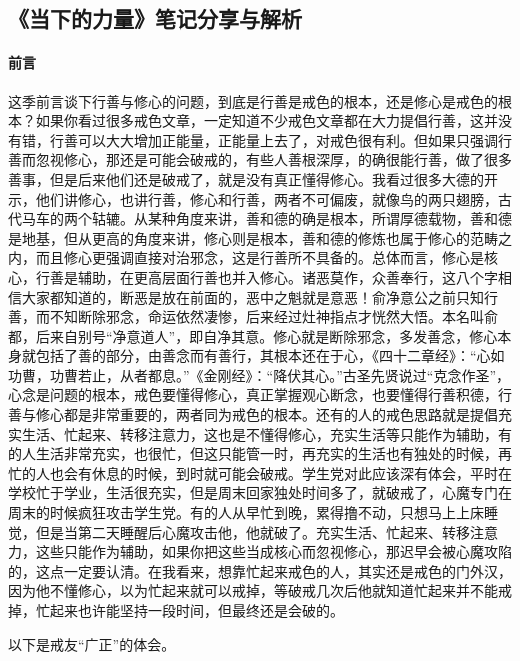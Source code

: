 \subsection{《当下的力量》笔记分享与解析}

\paragraph{前言}

这季前言谈下行善与修心的问题，到底是行善是戒色的根本，还是修心是戒色的根本？如果你看过很多戒色文章，一定知道不少戒色文章都在大力提倡行善，这并没有错，行善可以大大增加正能量，正能量上去了，对戒色很有利。但如果只强调行善而忽视修心，那还是可能会破戒的，有些人善根深厚，的确很能行善，做了很多善事，但是后来他们还是破戒了，就是没有真正懂得修心。我看过很多大德的开示，他们讲修心，也讲行善，修心和行善，两者不可偏废，就像鸟的两只翅膀，古代马车的两个轱辘。从某种角度来讲，善和德的确是根本，所谓厚德载物，善和德是地基，但从更高的角度来讲，修心则是根本，善和德的修炼也属于修心的范畴之内，而且修心更强调直接对治邪念，这是行善所不具备的。总体而言，修心是核心，行善是辅助，在更高层面行善也并入修心。诸恶莫作，众善奉行，这八个字相信大家都知道的，断恶是放在前面的，恶中之魁就是意恶！俞净意公之前只知行善，而不知断除邪念，命运依然凄惨，后来经过灶神指点才恍然大悟。本名叫俞都，后来自别号“净意道人”，即自净其意。修心就是断除邪念，多发善念，修心本身就包括了善的部分，由善念而有善行，其根本还在于心，《四十二章经》：“心如功曹，功曹若止，从者都息。”《金刚经》：“降伏其心。”古圣先贤说过“克念作圣”，心念是问题的根本，戒色要懂得修心，真正掌握观心断念，也要懂得行善积德，行善与修心都是非常重要的，两者同为戒色的根本。还有的人的戒色思路就是提倡充实生活、忙起来、转移注意力，这也是不懂得修心，充实生活等只能作为辅助，有的人生活非常充实，也很忙，但这只能管一时，再充实的生活也有独处的时候，再忙的人也会有休息的时候，到时就可能会破戒。学生党对此应该深有体会，平时在学校忙于学业，生活很充实，但是周末回家独处时间多了，就破戒了，心魔专门在周末的时候疯狂攻击学生党。有的人从早忙到晚，累得撸不动，只想马上上床睡觉，但是当第二天睡醒后心魔攻击他，他就破了。充实生活、忙起来、转移注意力，这些只能作为辅助，如果你把这些当成核心而忽视修心，那迟早会被心魔攻陷的，这点一定要认清。在我看来，想靠忙起来戒色的人，其实还是戒色的门外汉，因为他不懂修心，以为忙起来就可以戒掉，等破戒几次后他就知道忙起来并不能戒掉，忙起来也许能坚持一段时间，但最终还是会破的。

以下是戒友“广正”的体会。

